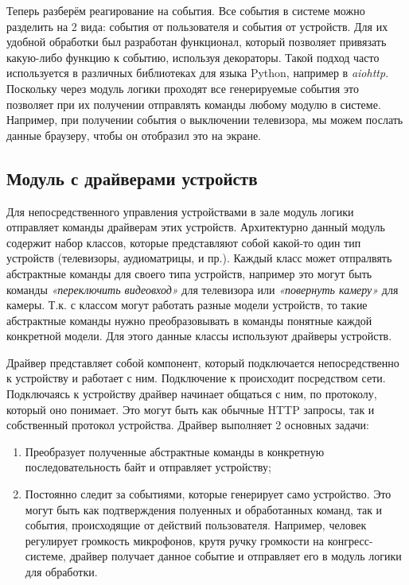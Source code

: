 Теперь разберём реагирование на события. Все события в системе можно разделить на 2 вида: события от пользователя и события
от устройств. Для их удобной обработки был разработан функционал, который позволяет привязать какую-либо функцию к событию,
используя декораторы. Такой подход часто используется в различных библиотеках для языка Python, например в \textit{aiohttp}.
Поскольку через модуль логики проходят все генерируемые события это позволяет при их получении отправлять команды любому
модулю в системе. Например, при получении события о выключении телевизора, мы можем послать данные браузеру, чтобы он
отобразил это на экране.

\subsection{Модуль с драйверами устройств}

Для непосредственного управления устройствами в зале модуль логики отправляет команды драйверам этих устройств. Архитектурно
данный модуль содержит набор классов, которые представляют собой какой-то один тип устройств (телевизоры, аудиоматрицы, и пр.).
Каждый класс может отпралвять абстрактные команды для своего типа устройств, например это могут быть команды
\textit{«переключить видеовход»} для телевизора или \textit{«повернуть камеру»} для камеры. Т.к. с классом могут работать
разные модели устройств, то такие абстрактные команды нужно преобразовывать в команды понятные каждой конкретной модели.
Для этого данные классы используют драйверы устройств.

Драйвер представляет собой компонент, который подключается непосредственно к устройству и работает с ним. Подключение к
происходит посредством сети. Подключаясь к устройству драйвер начинает общаться с ним, по протоколу, который оно понимает.
Это могут быть как обычные HTTP запросы, так и собственный протокол устройства. Драйвер выполняет 2 основных задачи:
\begin{enumerate}
    \item Преобразует полученные абстрактные команды в конкретную последовательность байт и отправляет устройству;
    \item Постоянно следит за событиями, которые генерирует само устройство. Это могут быть как подтверждения полуенных
    и обработанных команд, так и события, происходящие от действий пользователя. Например, человек регулирует громкость
    микрофонов, крутя ручку громкости на конгресс-системе, драйвер получает данное событие и отправляет его в модуль логики
    для обработки.
\end{enumerate}

